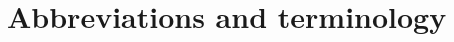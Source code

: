 \documentclass{report}
\begin{document}
	
	
	\chapter{Abbreviations and terminology}
	
	
	
	
	
	
	
	
	
	\printbibliography
	
\end{document}
